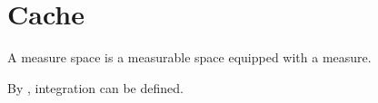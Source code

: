 \section{Cache}

\begin{definition}
A measure space is a measurable space equipped with a measure.
\end{definition}

By , integration can be defined.
